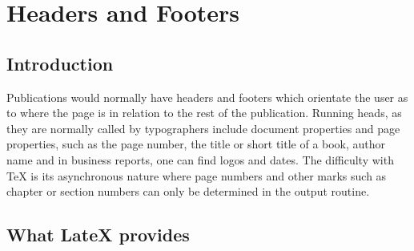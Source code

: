 



\clearpage

\chapter{Headers and Footers}

\thispagestyle{fancybook}
\pagestyle{fancybook}

\section{Introduction}

Publications would normally have headers and footers which orientate the user as to where the page is in relation to the rest of the publication. Running heads, as they are normally called by typographers include document properties and page properties, such as the page number, the title or short title of a book, author name and in business reports, one can find logos and dates. The difficulty with TeX is its asynchronous nature where page numbers and other marks such as chapter or section numbers can only be determined in the output routine.



\section{What LateX provides}

